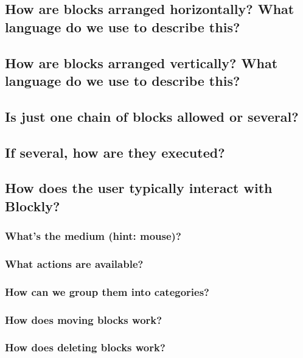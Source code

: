 \documentclass[]{article}
\begin{document}
\subsection{How are blocks arranged horizontally? What language do we use to describe this?}

\subsection{How are blocks arranged vertically? What language do we use to describe this?}

\subsection{Is just one chain of blocks allowed or several?}

\subsection{If several, how are they executed?}

\subsection{How does the user typically interact with Blockly?}

\subsubsection{What's the medium (hint: mouse)?}

\subsubsection{What actions are available?}

\subsubsection{How can we group them into categories?}

\subsubsection{How does moving blocks work?}

\subsubsection{How does deleting blocks work?}
\end{document}
